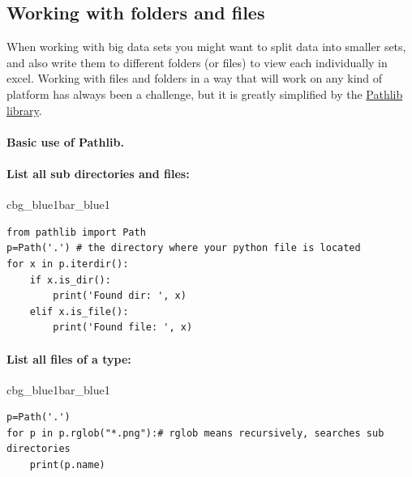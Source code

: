 \documentclass[%
oneside,                 %
final,                   %
10pt]{article}
\newenvironment{_pro_tight}[2]{
   \def\FrameCommand{\color{#2}\vrule width 1mm\normalcolor\colorbox{#1}}
   \FrameRule0.6pt\MakeFramed {\advance\hsize-2mm\FrameRestore}\vskip3mm}
   {\vskip0mm\endMakeFramed}
\newenvironment{pro}[2]{
\bgroup\rmfamily
\fboxsep=0mm\relax
\begin{_pro_tight}{#1}{#2}
\list{}{\parsep=-2mm\parskip=0mm\topsep=0pt\leftmargin=2mm
\rightmargin=2\leftmargin\leftmargin=4pt\relax}
\item\relax}
{\endlist\end{_pro_tight}\egroup}
\begin{document}
\subsection{Working with folders and files}
When working with big data sets you might want to split data into smaller sets, and also write them to different folders (or files) to view each individually in excel. Working with files and folders in a way that will work on any kind of platform has always been a challenge, but it is greatly simplified by the \href{{https://docs.python.org/3/library/pathlib.html}}{Pathlib library}.

\paragraph{Basic use of Pathlib.}
\paragraph{List all sub directories and files:}









\begin{pro}{cbg_blue1}{bar_blue1}\begin{Verbatim}[numbers=none,fontsize=\fontsize{9pt}{9pt},baselinestretch=0.95,xleftmargin=2mm]
from pathlib import Path
p=Path('.') # the directory where your python file is located
for x in p.iterdir():
    if x.is_dir():
        print('Found dir: ', x)
    elif x.is_file():
        print('Found file: ', x)

\end{Verbatim}
\end{pro}
\noindent


\paragraph{List all files of a type:}




\begin{pro}{cbg_blue1}{bar_blue1}\begin{Verbatim}[numbers=none,fontsize=\fontsize{9pt}{9pt},baselinestretch=0.95,xleftmargin=2mm]
p=Path('.')
for p in p.rglob("*.png"):# rglob means recursively, searches sub directories
    print(p.name)

\end{Verbatim}
\end{pro}
\noindent
\end{document}
